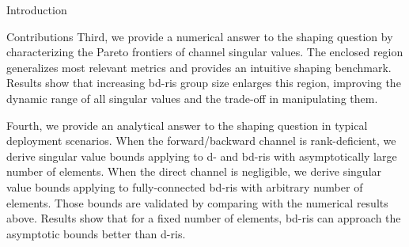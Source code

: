 \documentclass[journal]{IEEEtran}
\begin{document}
\begin{section}{Introduction}
\begin{subsection}{Contributions}
		Third, we provide a numerical answer to the shaping question by characterizing the Pareto frontiers of channel singular values.
		The enclosed region generalizes most relevant metrics and provides an intuitive shaping benchmark.
		Results show that increasing \gls{bd}-\gls{ris} group size enlarges this region, improving the dynamic range of all singular values and the trade-off in manipulating them.



		Fourth, we provide an analytical answer to the shaping question in typical deployment scenarios.
		When the forward/backward channel is rank-deficient, we derive singular value bounds applying to \gls{d}- and \gls{bd}-\gls{ris} with asymptotically large number of elements.
		When the direct channel is negligible, we derive singular value bounds applying to fully-connected \gls{bd}-\gls{ris} with arbitrary number of elements.
		Those bounds are validated by comparing with the numerical results above.
		Results show that for a fixed number of elements, \gls{bd}-\gls{ris} can approach the asymptotic bounds better than \gls{d}-\gls{ris}.


\end{subsection}
\end{section}
\end{document}
